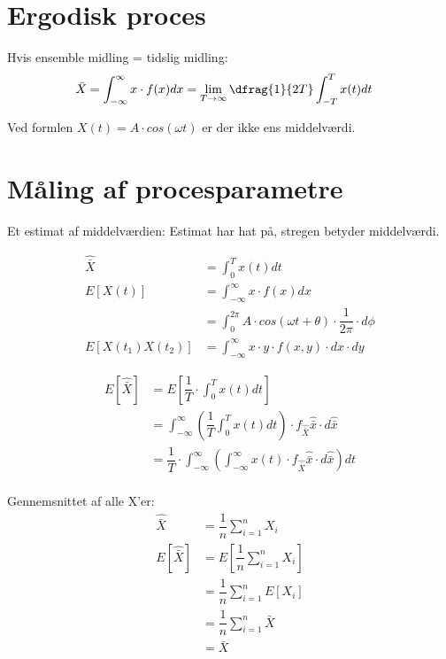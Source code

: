 \documentclass[Main]{subfiles}
\begin{document}


\section{Ergodisk proces} %
\label{sec:ergodisk_proces}

Hvis ensemble midling = tidslig midling:
\begin{align*}
\bar{X} &= \int_{-\infty}^\infty x \cdot f(x) dx = \lim\limits_{T \to \infty} \dfrag{1}{2T} \int_{-T}^T x(t) dt
\end{align*}

Ved formlen $X(t) = A \cdot cos(\omega t)$ er der ikke ens middelværdi.




\section{Måling af procesparametre} %
\label{sec:måling_af_procesparametre}


Et estimat af middelværdien:
Estimat har hat på, stregen betyder middelværdi.

\begin{align*}
\hat{\bar{X}} &= \int_0^T x(t) dt \\
E[ X(t) ] &= \int_{-\infty}^\infty x \cdot f(x) dx  \\
	&= \int_0^{2 \pi} A \cdot cos(\omega t + \theta) \cdot \dfrac{1}{2 \pi} \cdot d\phi \\
E [ X(t_1) X(t_2)] &= \int_{-\infty}^{\infty} x \cdot y \cdot f(x,y) \cdot dx \cdot dy
\end{align*}

\begin{align*}
E[\hat{\bar{X}} ] &= E[ \dfrac{1}{T} \cdot \int_0^T x(t) dt] \\
	&= \int_{-\infty}^\infty (\dfrac{1}{T} \int_0^T x(t) dt) \cdot f_{\hat{\bar{X}}}{\hat{\bar{x}}} \cdot d{\hat{\bar{x}}} \\
	&= \dfrac{1}{T} \cdot \int_{-\infty}^\infty (\int_{-\infty}^\infty x(t)  \cdot f_{\hat{\bar{X}}}{\hat{\bar{x}}} \cdot d{\hat{\bar{x}}} ) dt \\
\end{align*}

Gennemsnittet af alle X'er:
\begin{align*}
\hat{\bar{X}} &= \dfrac{1}{n} \sum_{i=1}^n X_i \\
E[\hat{\bar{X}}] &= E[\dfrac{1}{n} \sum_{i=1}^n X_i] \\
	&= \dfrac{1}{n} \sum_{i=1}^n E[X_i] \\
	&= \dfrac{1}{n} \sum_{i=1}^n \bar{X} \\
	&= \bar{X}
\end{align*}
\end{document}
